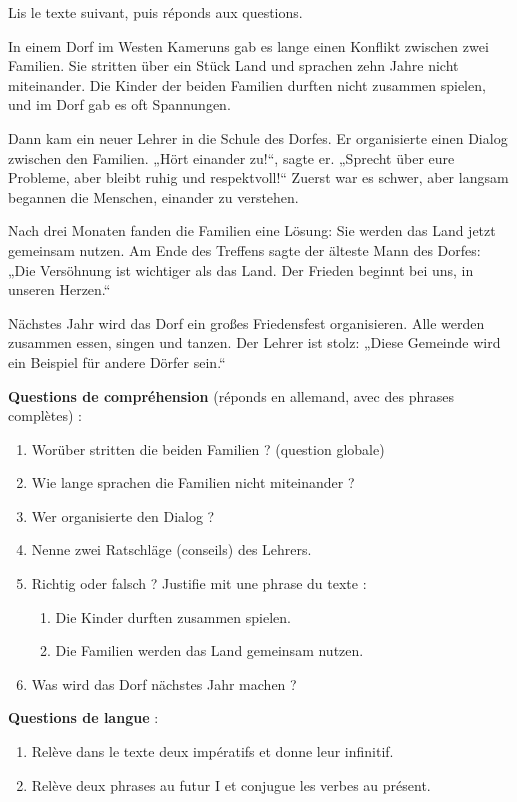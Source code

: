 \documentclass[11pt]{article}
\begin{document}
\begin{exercice}
Lis le texte suivant, puis réponds aux questions.

\begin{textebox}
In einem Dorf im Westen Kameruns gab es lange einen Konflikt zwischen zwei Familien. Sie stritten über ein Stück Land und sprachen zehn Jahre nicht miteinander. Die Kinder der beiden Familien durften nicht zusammen spielen, und im Dorf gab es oft Spannungen.

Dann kam ein neuer Lehrer in die Schule des Dorfes. Er organisierte einen Dialog zwischen den Familien. „Hört einander zu!“, sagte er. „Sprecht über eure Probleme, aber bleibt ruhig und respektvoll!“ Zuerst war es schwer, aber langsam begannen die Menschen, einander zu verstehen.

Nach drei Monaten fanden die Familien eine Lösung: Sie werden das Land jetzt gemeinsam nutzen. Am Ende des Treffens sagte der älteste Mann des Dorfes: „Die Versöhnung ist wichtiger als das Land. Der Frieden beginnt bei uns, in unseren Herzen.“

Nächstes Jahr wird das Dorf ein großes Friedensfest organisieren. Alle werden zusammen essen, singen und tanzen. Der Lehrer ist stolz: „Diese Gemeinde wird ein Beispiel für andere Dörfer sein.“
\end{textebox}

\textbf{Questions de compréhension} (réponds en allemand, avec des phrases complètes) :
\begin{enumerate}
\item Worüber stritten die beiden Familien ? (question globale)
\item Wie lange sprachen die Familien nicht miteinander ?
\item Wer organisierte den Dialog ?
\item Nenne zwei Ratschläge (conseils) des Lehrers.
\item Richtig oder falsch ? Justifie mit une phrase du texte :
\begin{enumerate}
\item Die Kinder durften zusammen spielen.
\item Die Familien werden das Land gemeinsam nutzen.
\end{enumerate}
\item Was wird das Dorf nächstes Jahr machen ?
\end{enumerate}

\textbf{Questions de langue} :
\begin{enumerate}
\item Relève dans le texte deux impératifs et donne leur infinitif.
\item Relève deux phrases au futur I et conjugue les verbes au présent.
\end{enumerate}
\end{exercice}
\end{document}
